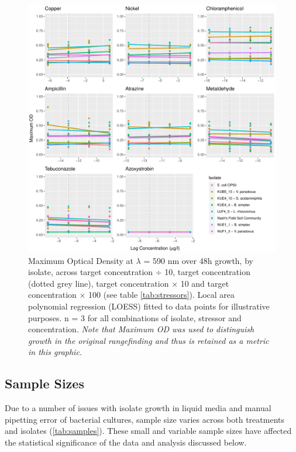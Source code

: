 \documentclass[final,1p,times]{elsarticle}
\begin{document}
\begin{figure}[H]
    \centering
    \includegraphics[width = \textwidth]{Scripts/Results/Bug_Rangefinding/plots_rangefinding.pdf}
    \caption{Maximum Optical Density at $\lambda$ = 590 nm over 48h growth, by isolate, across target concentration ÷ 10, target concentration (dotted grey line), target concentration × 10 and target concentration × 100 (see table \ref{tab:stressors}). Local area polynomial regression (LOESS) fitted to data points for illustrative purposes. n = 3 for all combinations of isolate, stressor and concentration. \textit{Note that Maximum OD was used to distinguish growth in the original rangefinding and thus is retained as a metric in this graphic.}}
    \label{fig:rangefinding}
\end{figure}

\subsection{Sample Sizes}
\label{S:3:2}

Due to a number of issues with isolate growth in liquid media and manual pipetting error of bacterial cultures, sample size varies across both treatments and isolates (\cref{tab:samples}). These small and variable sample sizes have affected the statistical significance of the data and analysis discussed below.
\end{document}
